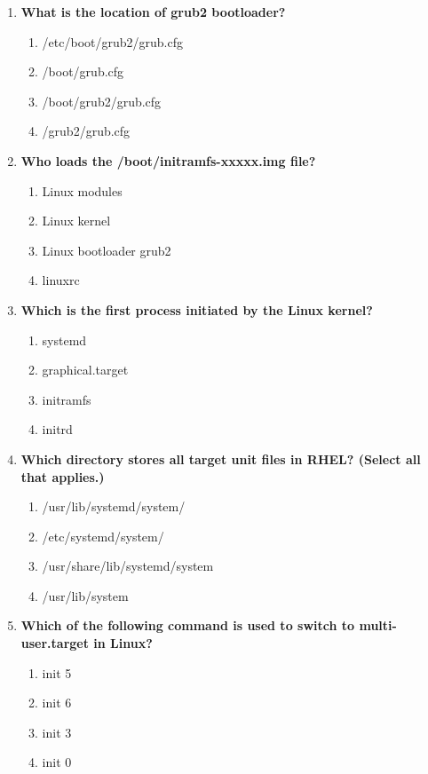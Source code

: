 \begin{flushleft}
\begin{enumerate}
		\item \textbf{What is the location of grub2 bootloader?}
		\begin{enumerate}[label=(\alph*)]
			\item /etc/boot/grub2/grub.cfg
			\item /boot/grub.cfg
			\item /boot/grub2/grub.cfg  %
			\item /grub2/grub.cfg
		\end{enumerate}
		\bigskip
		\bigskip
		\newpage
		\item \textbf{Who loads the /boot/initramfs-xxxxx.img file?}
		\begin{enumerate}[label=(\alph*)]
			\item Linux modules
			\item Linux kernel   %
			\item Linux bootloader grub2  
			\item linuxrc
		\end{enumerate}
		\bigskip
		\bigskip	

		\item \textbf{Which is the first process initiated by the Linux kernel?}
		\begin{enumerate}[label=(\alph*)]
			\item systemd  %
			\item graphical.target
			\item initramfs
			\item initrd
		\end{enumerate}
		\bigskip
		\bigskip

		\item \textbf{Which directory stores all target unit files in RHEL? (Select all that applies.)}
		\begin{enumerate}[label=(\alph*)]
			\item /usr/lib/systemd/system/  %
			\item /etc/systemd/system/  %
			\item /usr/share/lib/systemd/system
			\item /usr/lib/system
		\end{enumerate}
		\bigskip
		\bigskip

		\item \textbf{Which of the following command is used to switch to multi-user.target in Linux?}
		\begin{enumerate}[label=(\alph*)]
			\item init 5 
			\item init 6 
			\item init 3  %
			\item init 0 
		\end{enumerate}
		\bigskip
		\bigskip


\end{enumerate}
\end{flushleft}
